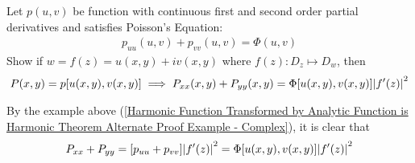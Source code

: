 \documentclass[12pt, english]{book}
\makeatletter
\renewenvironment{proof}[1][\proofname]{\par
	\pushQED{\qed}%
	\normalfont \topsep6\p@\@plus6\p@\relax
	\list{}{%
		\settowidth{\leftmargin}{\itshape\proofname:\hskip\labelsep}%
		\setlength{\labelwidth}{0pt}%
		\setlength{\itemindent}{-\leftmargin}%
		}%
	\item[\hskip\labelsep\itshape#1\@addpunct{:}]\ignorespaces
	}{\popQED\endlist\@endpefalse}
\makeatother
\begin{document}
	\begin{example}
		\label{Poisson's Equation Transformed by Analytic Function Example - Complex}
		Let \(p(u,v)\) be function with continuous first and second order partial derivatives and satisfies Poisson's Equation:
		\begin{align*}
			p_{uu}(u,v) + p_{vv}(u,v) = \Phi(u,v)
		\end{align*}
		Show if \(w = f(z) = u(x,y) + iv(x,y)\) where \(f(z): D_z \mapsto D_w\), then 
		\begin{align*}
			P(x,y) = p[u(x,y), v(x,y)]
			\implies P_{xx}(x,y) + P_{yy}(x,y) = \Phi[u(x,y), v(x,y)] \abs{f'(z)}^2
		\end{align*}
		\begin{proof}
			{\color{Grey}
			By the example above (\cref{Harmonic Function Transformed by Analytic Function is Harmonic Theorem Alternate Proof Example - Complex}), it is clear that
			\begin{align*}
				P_{xx} + P_{yy} 
				= [p_{uu} + p_{vv}] \abs{f'(z)}^2 
				= \Phi[u(x,y), v(x,y)] \abs{f'(z)}^2
			\end{align*}}
		\end{proof}
	\end{example}
\end{document}
